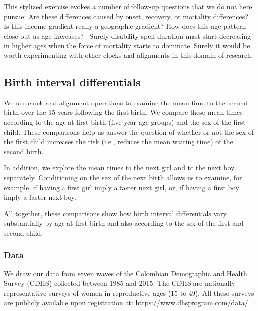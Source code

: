 \documentclass{article}
\begin{document}
This stylized exercise evokes a number of follow-up questions that we do not here pursue: Are these differences caused by onset, recovery, or mortality differences? Is this income gradient really a geographic gradient? How does this age pattern close out as age increases?-- Surely disability spell duration must start decreasing in higher ages when the force of mortality starts to dominate. Surely it would be worth experimenting with other clocks and alignments in this domain of research.

\subsection{Birth interval differentials}

 We use clock and alignment operations to examine the mean time to the second birth over the 15 years following the first birth. We compare these mean times according to the age at first birth (five-year age groups) and the sex of the first child. These comparisons help us answer the question of whether or not the sex of the first child increases the risk (i.e., reduces the mean waiting time) of the second birth. 
 
 In addition, we explore the mean times to the next girl and to the next boy separately. Conditioning on the sex of the next birth allows us to examine, for example, if having a first girl imply a faster next girl, or, if having a first boy imply a faster next boy. 
 
 All together, these comparisons show how birth interval differentials vary substantially by age at first birth and also according to the sex of the first and second child.
 
\subsubsection{Data}

We draw our data from seven waves of the Colombian Demographic and Health Survey (CDHS) collected between 1985 and 2015. The CDHS are nationally representative surveys of women in reproductive ages (15 to 49). All these surveys are publicly available upon registration at: \url{https://www.dhsprogram.com/data/}.
\end{document}

